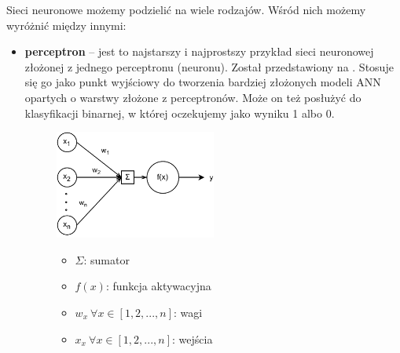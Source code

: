 Sieci neuronowe możemy podzielić na wiele rodzajów. Wśród nich możemy wyróżnić między innymi:
\begin{itemize}
    \item \textbf{perceptron} -- jest to najstarszy i najprostszy przykład sieci neuronowej złożonej z jednego perceptronu (neuronu). Został przedstawiony na . Stosuje się go jako punkt wyjściowy do tworzenia bardziej złożonych modeli ANN opartych o warstwy złożone z perceptronów. Może on też posłużyć do klasyfikacji binarnej, w której oczekujemy jako wyniku 1 albo 0.
\begin{figure}[H]
    \centering
    \includegraphics[width=0.5\textwidth]{images/neuron}
    \begin{itemize}
        \item[] $\Sigma$: sumator
        \item[] $f(x)$: funkcja aktywacyjna
        \item[] $w_x \  \forall x \in [1, 2, ..., n]$: wagi
        \item[] $x_x \  \forall x \in [1, 2, ..., n]$: wejścia
    \end{itemize}
    \label{fig:neuron}
\end{figure}


\end{itemize}
